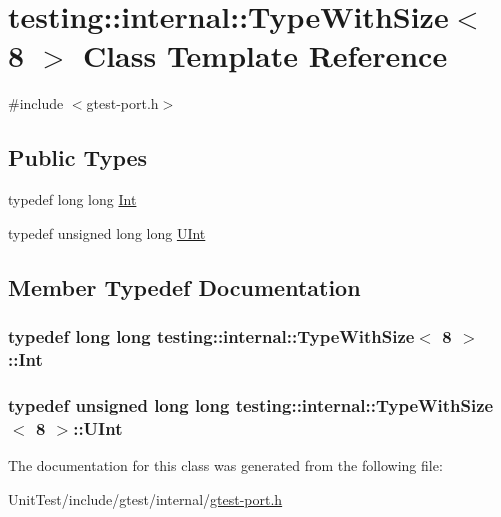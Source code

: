 \hypertarget{classtesting_1_1internal_1_1_type_with_size_3_018_01_4}{\section{testing\+:\+:internal\+:\+:Type\+With\+Size$<$ 8 $>$ Class Template Reference}
\label{classtesting_1_1internal_1_1_type_with_size_3_018_01_4}
}


{\ttfamily \#include $<$gtest-\/port.\+h$>$}

\subsection*{Public Types}
\begin{DoxyCompactItemize}
\item 
typedef long long \hyperlink{classtesting_1_1internal_1_1_type_with_size_3_018_01_4_a36d5697e5f5254b0495f13c97d747e36}{Int}
\item 
typedef unsigned long long \hyperlink{classtesting_1_1internal_1_1_type_with_size_3_018_01_4_a747e21c5aee8faf07ec65cd4c3d1ca62}{U\+Int}
\end{DoxyCompactItemize}


\subsection{Member Typedef Documentation}
\hypertarget{classtesting_1_1internal_1_1_type_with_size_3_018_01_4_a36d5697e5f5254b0495f13c97d747e36}{
\subsubsection[{Int}]{\setlength{\rightskip}{0pt plus 5cm}typedef long long {\bf testing\+::internal\+::\+Type\+With\+Size}$<$ 8 $>$\+::{\bf Int}}}\label{classtesting_1_1internal_1_1_type_with_size_3_018_01_4_a36d5697e5f5254b0495f13c97d747e36}
\hypertarget{classtesting_1_1internal_1_1_type_with_size_3_018_01_4_a747e21c5aee8faf07ec65cd4c3d1ca62}{
\subsubsection[{U\+Int}]{\setlength{\rightskip}{0pt plus 5cm}typedef unsigned long long {\bf testing\+::internal\+::\+Type\+With\+Size}$<$ 8 $>$\+::{\bf U\+Int}}}\label{classtesting_1_1internal_1_1_type_with_size_3_018_01_4_a747e21c5aee8faf07ec65cd4c3d1ca62}


The documentation for this class was generated from the following file\+:\begin{DoxyCompactItemize}
\item 
Unit\+Test/include/gtest/internal/\hyperlink{gtest-port_8h}{gtest-\/port.\+h}\end{DoxyCompactItemize}
